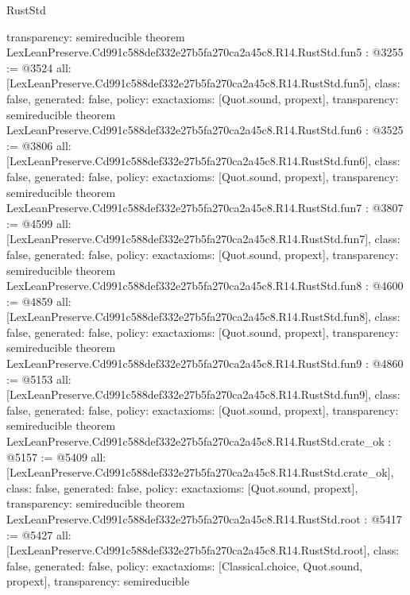 \begin{lexlean}{RustStd}
\begin{coremodule}
{  transparency: semireducible
}
theorem LexLeanPreserve.Cd991c588def332e27b5fa270ca2a45c8.R14.RustStd.fun5 : @3255 := @3524 {
  all: [LexLeanPreserve.Cd991c588def332e27b5fa270ca2a45c8.R14.RustStd.fun5],
  class: false,
  generated: false,
  policy: exact{axioms: [Quot.sound, propext]},
  transparency: semireducible
}
theorem LexLeanPreserve.Cd991c588def332e27b5fa270ca2a45c8.R14.RustStd.fun6 : @3525 := @3806 {
  all: [LexLeanPreserve.Cd991c588def332e27b5fa270ca2a45c8.R14.RustStd.fun6],
  class: false,
  generated: false,
  policy: exact{axioms: [Quot.sound, propext]},
  transparency: semireducible
}
theorem LexLeanPreserve.Cd991c588def332e27b5fa270ca2a45c8.R14.RustStd.fun7 : @3807 := @4599 {
  all: [LexLeanPreserve.Cd991c588def332e27b5fa270ca2a45c8.R14.RustStd.fun7],
  class: false,
  generated: false,
  policy: exact{axioms: [Quot.sound, propext]},
  transparency: semireducible
}
theorem LexLeanPreserve.Cd991c588def332e27b5fa270ca2a45c8.R14.RustStd.fun8 : @4600 := @4859 {
  all: [LexLeanPreserve.Cd991c588def332e27b5fa270ca2a45c8.R14.RustStd.fun8],
  class: false,
  generated: false,
  policy: exact{axioms: [Quot.sound, propext]},
  transparency: semireducible
}
theorem LexLeanPreserve.Cd991c588def332e27b5fa270ca2a45c8.R14.RustStd.fun9 : @4860 := @5153 {
  all: [LexLeanPreserve.Cd991c588def332e27b5fa270ca2a45c8.R14.RustStd.fun9],
  class: false,
  generated: false,
  policy: exact{axioms: [Quot.sound, propext]},
  transparency: semireducible
}
theorem LexLeanPreserve.Cd991c588def332e27b5fa270ca2a45c8.R14.RustStd.crate_ok : @5157 := @5409 {
  all: [LexLeanPreserve.Cd991c588def332e27b5fa270ca2a45c8.R14.RustStd.crate_ok],
  class: false,
  generated: false,
  policy: exact{axioms: [Quot.sound, propext]},
  transparency: semireducible
}
theorem LexLeanPreserve.Cd991c588def332e27b5fa270ca2a45c8.R14.RustStd.root : @5417 := @5427 {
  all: [LexLeanPreserve.Cd991c588def332e27b5fa270ca2a45c8.R14.RustStd.root],
  class: false,
  generated: false,
  policy: exact{axioms: [Classical.choice, Quot.sound, propext]},
  transparency: semireducible
}


\end{coremodule}
\end{lexlean}
